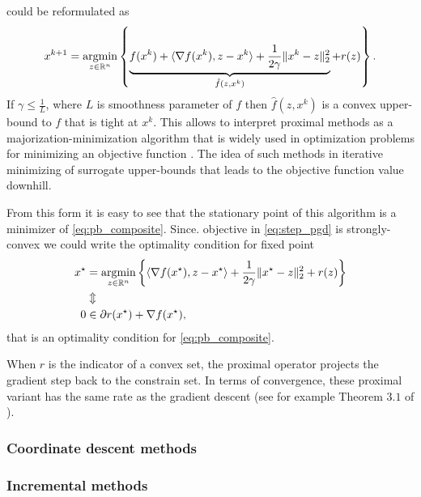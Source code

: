  could be reformulated as
\begin{equation}\label{eq:step_pgd}
x^{k+1} = \operatorname*{argmin}_{z\in\mathbb{R}^n}\left\{\underbrace{f(x^k) + \langle\nabla f(x^k), z-x^k\rangle+\frac{1}{2\gamma}\|x^k-z\|_2^2}_{\hat{f}(z, x^k)} + r(z)\right\}.
\end{equation}
If $\gamma\leq \frac{1}{L}$, where $L$ is  smoothness parameter of $f$ then $\hat{f}(z, x^k)$ is a convex upper-bound to $f$ that is tight at $x^k$. This allows to interpret proximal methods as a majorization-minimization algorithm \cite{lange2000optimization} {that is widely used in optimization problems for minimizing an objective function \cite{cappe2009line, neal1998view,gasso2009recovering,wright2009sparse,mairal2015incremental}. The idea of such methods in iterative minimizing of surrogate upper-bounds that leads to the objective function value downhill.}

From this form it is easy to see that the stationary point of this algorithm is a minimizer of \eqref{eq:pb_composite}. Since.  objective in \eqref{eq:step_pgd} is strongly-convex we could write the optimality condition for fixed point
\begin{align*}
x^\star &= \operatorname*{argmin}_{z\in\mathbb{R}^n}\left\{\langle\nabla f(x^\star), z-x^\star\rangle+\frac{1}{2\gamma}\|x^\star-z\|_2^2 + r(z)\right\}\\
&\Updownarrow\\
0&\in \partial r(x^\star) + \nabla f(x^\star),
\end{align*}
that is an optimality condition for \eqref{eq:pb_composite}.

When $r$ is the indicator of a convex set, the proximal operator projects the gradient step back to the constrain set.
In terms of convergence, these proximal variant has the same rate as the gradient descent (see for example Theorem $3.1$ of \cite{beck2009fast}).

\subsubsection{Coordinate descent methods}


\subsubsection{Incremental methods}
